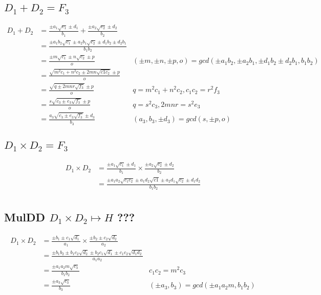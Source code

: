 \documentclass{article}
\begin{document}
\subsection{$D_1 + D_2 = F_3$}
\begin{align*}
D_1 + D_2 &= \frac{\pm a_1\sqrt{c_1} \pm d_1 }{b_1} + \frac{\pm a_2\sqrt{c_2} \pm d_2 }{b_2}\\
 &= \frac{\pm a_1b_2\sqrt{c_1} \pm a_2b_1\sqrt{c_2} \pm d_1b_2 \pm d_2b_1}{b_1b_2} \\
 &= \frac{\pm m\sqrt{c_1} \pm n\sqrt{c_2} \pm p }{o}
     & (\pm m, \pm n, \pm p, o) = gcd(\pm a_1b_2, \pm a_2b_1, \pm d_1b_2 \pm d_2b_1, b_1b_2)\\
 &= \frac{\sqrt{m^2c_1 + n^2c_2 \pm 2mn\sqrt{c1c_2}} \pm p }{o} \\
 &= \frac{\sqrt{q \pm 2mnr\sqrt{f_3}} \pm p}{o}     & q = m^2c_1 + n^2c_2, c_1c_2 = r^2f_3\\
 &= \frac{s\sqrt{c_3 \pm e_3\sqrt{f_3}} \pm p}{o}   & q = s^2c_3, 2mnr = s^2e_3 \\
 &= \frac{a_3\sqrt{c_3 \pm e_3\sqrt{f_3}} \pm d_3}{b_3}
    & (a_3, b_3, \pm d_3) = gcd(s, \pm p, o)
\end{align*}

\subsection{$D_1 \times D_2 = F_3$}
\begin{align*}
D_1 \times D_2 &= \frac{\pm a_1\sqrt{c_1} \pm d_1 }{b_1} \times \frac{\pm a_2\sqrt{c_2} \pm d_2 }{b_2}\\
 &= \frac{\pm a_1a_2\sqrt{c_1c_2} \pm a_1d_2\sqrt{c1} \pm a_2d_1\sqrt{c_2} \pm d_1d_2}{b_1b_2}\\
\end{align*}

\subsection{MulDD $D_1 \times D_2 \mapsto H$ ???}
\begin{align*}
D_1 \times D_2 &= \frac{\pm b_1 \pm c_1\sqrt{d_1}}{a_1} \times \frac{\pm b_2 \pm c_2\sqrt{d_2}}{a_2}\\
 &= \frac{\pm b_1b_2 \pm b_1c_2\sqrt{d_2} \pm b_2c_1\sqrt{d_1} \pm c_1c_2\sqrt{d_1d_2} }{a_1a_2}\\
 &= \frac{\pm a_1a_2m\sqrt{c_3}}{b_1b_2} & c_1c_2 = m^2c_3\\
 &= \frac{\pm a_3\sqrt{c_3}}{b_3} & (\pm a_3,b_3) = gcd(\pm a_1a_2m,b_1b_2)
\end{align*}
\end{document}
